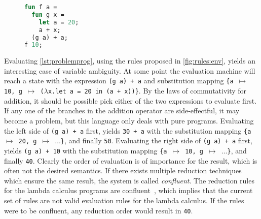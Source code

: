 \documentclass[11pt,oneside,a4paper]{report}
\begin{document}
\begin{figure}[ht]
\begin{lstlisting}[language=ML,caption={Problematic program},label={lst:problemprog},mathescape=true]
fun f a = 
  fun g x = 
    let a = 20;
    a + x;
  (g a) + a;
f 10;
\end{lstlisting}
\end{figure}
Evaluating \autoref{lst:problemprog}, using the rules proposed in \autoref{fig:rules:env}, yields an interesting case of variable ambiguity.
At some point the evaluation machine will reach a state with the expression \texttt{(g a) + a} and substitution mapping \texttt{\{a $\mapsto$ 10, g $\mapsto$ ($\lambda$x.let a = 20 in (a + x))\}}.
By the laws of commutativity for addition, it should be possible pick either of the two expressions to evaluate first.
If any one of the branches in the addition operator are side-effectful, it may become a problem, but this language only deals with pure programs.
Evaluating the left side of \texttt{(g a) + a} first, yields \texttt{30 + a} with the substitution mapping \texttt{\{a $\mapsto$ 20, g $\mapsto$ $\dots$\}}, and finally \texttt{50}.
Evaluating the right side of \texttt{(g a) + a} first, yields \texttt{(g a) + 10} with the substitution mapping \texttt{\{a $\mapsto$ 10, g $\mapsto$ $\dots$\}}, and finally \texttt{40}.
Clearly the order of evaluation is of importance for the result, which is often not the desired semantics.
If there exists multiple reduction techniques which ensure the same result, the system is called \textit{confluent}.
The reduction rules for the lambda calculus programs are confluent~\cite{church1936some}, which implies that the current set of rules are not valid evaluation rules for the lambda calculus.
If the rules were to be confluent, any reduction order would result in \texttt{40}.
\end{document}
